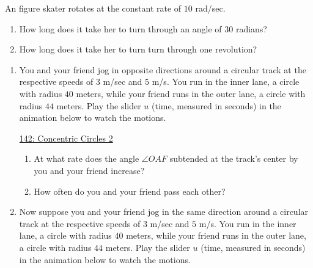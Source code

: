 \documentclass{ximera}
\begin{document}
\begin{question} \label{Qodfdstr43}
An figure skater rotates at the constant rate of $10$ rad/sec. 
\begin{enumerate}
\item How long does it take her to turn through an angle of $30$ radians?

\item How long does it take her to turn turn through one revolution?

\end{enumerate}
\end{question}


\begin{question} \label{QOLfdfdthnhgfg}

\begin{enumerate}
\item You and your friend jog in opposite directions around a circular track at the respective speeds of $3$ m/sec and $5$ m/s. You run in the inner lane, a circle with radius $40$ meters, while your friend runs in the outer lane, a circle with radius $44$ meters. Play the slider $u$ (time, measured in seconds) in the animation below to watch the motions.

\begin{onlineOnly}
\begin{center}
\end{center}
\end{onlineOnly}

\href{https://www.desmos.com/calculator/a1jmg3x2mz}{142: Concentric Circles 2}

\begin{enumerate}
\item At what rate does the angle $\angle OAF$ subtended at the track's center by you and your friend increase?

\item How often do you and your friend pass each other?

\end{enumerate}


\item Now suppose you and your friend jog in the same direction around a circular track at the respective speeds of $3$ m/sec and $5$ m/s. You run in the inner lane, a circle with radius $40$ meters, while your friend runs in the outer lane, a circle with radius $44$ meters. Play the slider $u$ (time, measured in seconds) in the animation below to watch the motions.


\end{enumerate}
\end{question}
\end{document}
